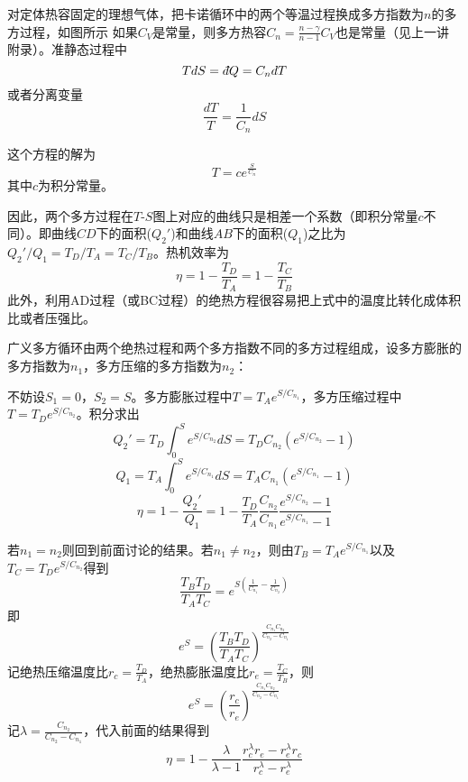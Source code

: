 \documentclass[CJK]{beamer}
\begin{document}
\begin{frame}
\bch
{}
对定体热容固定的理想气体，把卡诺循环中的两个等温过程换成多方指数为$n$的多方过程，如图所示
\emini
{}
\emini
如果$C_V$是常量，则多方热容$C_n =\frac{n-\gamma}{n-1}C_V$也是常量（见上一讲附录）。准静态过程中
$$ TdS = \dbar Q  = C_n dT $$
或者分离变量
$$\frac{dT}{T} = \frac{1}{C_n} dS$$
\ech
\end{frame}


\begin{frame}
\bch
{}
这个方程的解为
$$T =  c e^{\frac{S}{C_n} }$$
其中$c$为积分常量。
\emini
{}
\emini

因此，两个多方过程在$T$-$S$图上对应的曲线只是相差一个系数（即积分常量$c$不同）。即曲线$CD$下的面积($Q_2'$)和曲线$AB$下的面积($Q_1$)之比为$Q_2'/Q_1=T_D/T_A = T_C/T_B$。热机效率为
$$ \eta = 1 - \frac{T_D}{T_A} = 1 - \frac{T_C}{T_B}$$
{\scriptsize 此外，利用AD过程（或BC过程）的绝热方程很容易把上式中的温度比转化成体积比或者压强比。}

\ech
\end{frame}

\begin{frame}
\bch
{}
广义多方循环由两个绝热过程和两个多方指数不同的多方过程组成，设多方膨胀的多方指数为$n_1$，多方压缩的多方指数为$n_2$：
\emini
{}
\emini

{\scriptsize 
不妨设$S_1=0$，$S_2=S$。多方膨胀过程中$T = T_A e^{S/C_{n_1}}$，多方压缩过程中$T= T_D e^{S/C_{n_2}}$。积分求出
$$Q_2' = T_D \int_0^S e^{S/C_{n_2}} dS = T_DC_{n_2}\left(e^{S/C_{n_2}}-1\right)$$
$$Q_1  = T_A \int_0^S e^{S/C_{n_1}} dS = T_AC_{n_1}\left(e^{S/C_{n_1}}-1\right)$$
$$\eta = 1-\frac{Q_2'}{Q_1} = 1 - \frac{T_D}{T_A} \frac{C_{n_2}}{C_{n_1}} \frac{e^{S/C_{n_2}}-1}{e^{S/C_{n_1}}-1}$$
}
\ech
\end{frame}

\begin{frame}
\bch
{\scriptsize 
若$n_1=n_2$则回到前面讨论的结果。若$n_1\ne n_2$，则由$T_B = T_A e^{S/C_{n_1}}$以及$T_C = T_D e^{S/C_{n_2}}$得到
$$\frac{T_B T_D}{T_AT_C} = e^{S\left(\frac{1}{C_{n_1}} - \frac{1}{C_{n_2}}\right)}$$
即
$$ e^S = \left(\frac{T_B T_D}{T_AT_C}\right)^{\frac{C_{n_1}C_{n_2}}{C_{n_2}-C_{n_1}}}$$
记绝热压缩温度比$r_c = \frac{T_D}{T_A}$，绝热膨胀温度比$r_e = \frac{T_C}{T_B}$，则
$$ e^S = \left(\frac{r_c}{r_e}\right)^{\frac{C_{n_1}C_{n_2}}{C_{n_2}-C_{n_1}}}$$
记{\blue $\lambda = \frac{C_{n_2}}{C_{n_2}-C_{n_1}}$}，代入前面的结果得到
{\blue $$\eta =1- \frac{\lambda}{\lambda-1} \frac{r_c^\lambda r_e - r_e^\lambda r_c}{r_c^\lambda - r_e^\lambda}$$}
}
\ech
\end{frame}
\end{document}
